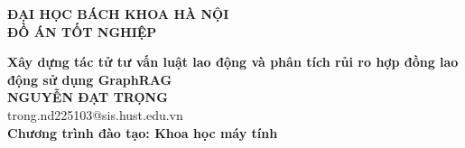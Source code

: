 \documentclass[DoAn.tex]{subfiles}
\begin{document}
\begin{titlepage}
\thispagestyle{empty}
\begin{center}

{\textbf{\large{ĐẠI HỌC BÁCH KHOA HÀ NỘI}}}\\[4cm]

{\textbf{\huge{ ĐỒ ÁN TỐT NGHIỆP}}}\\[1cm]
{\textbf{\Large{Xây dựng tác tử tư vấn luật lao động và phân tích rủi ro hợp đồng lao động sử dụng GraphRAG}}\\[1cm]

{\textbf{\large{NGUYỄN ĐẠT TRỌNG}}}\\
{\large{trong.nd225103@sis.hust.edu.vn}}\\[0.5cm]

{\textbf{\large{Chương trình đào tạo: Khoa học máy tính
}}}\\

\vspace{3cm}
\begin{table}[H]
\centering
{}
\end{table}}
\end{center}



\end{titlepage}
\end{document}
